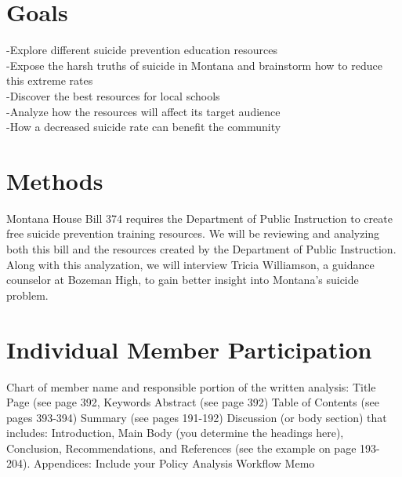 \documentclass[10pt,letterpaper]{article}
\begin{document}
\section*{Goals}

-Explore different suicide prevention education resources \\
-Expose the harsh truths of suicide in Montana and brainstorm how to reduce this extreme rates\\
-Discover the best resources for local schools \\
-Analyze how the resources will affect its target audience\\
-How a decreased suicide rate can benefit the community\\

\section*{Methods}

Montana House Bill 374 requires the Department of Public Instruction to create free suicide prevention training resources. We will be reviewing and analyzing both this bill and the resources created by the Department of Public Instruction. Along with this analyzation, we will interview Tricia Williamson, a guidance counselor at Bozeman High, to gain better insight into Montana's suicide problem.


\section*{Individual Member Participation}

Chart of member name and responsible portion of the written analysis:
Title Page (see page 392, Keywords
Abstract (see page 392)
Table of Contents (see pages 393-394)
Summary (see pages 191-192)
Discussion (or body section) that includes: Introduction, Main Body (you determine the headings here), Conclusion, Recommendations, and References (see the example on page 193-204).
Appendices: Include your Policy Analysis Workflow Memo


\newpage
\end{document}
